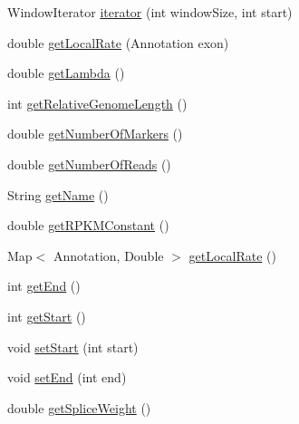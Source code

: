 \begin{DoxyCompactItemize}
Window\+Iterator \hyperlink{classbroad_1_1pda_1_1seq_1_1graph_1_1_chromosome_with_bubbles_j_graph_t_ad93630c30d07df9cb9a639e656a0851c}{iterator} (int window\+Size, int start)
\item 
double \hyperlink{classbroad_1_1pda_1_1seq_1_1graph_1_1_chromosome_with_bubbles_j_graph_t_adda80fdb6e6d20255389643e6cb4d3a2}{get\+Local\+Rate} (Annotation exon)
\item 
double \hyperlink{classbroad_1_1pda_1_1seq_1_1graph_1_1_chromosome_with_bubbles_j_graph_t_a7d20d81fde6834294a8876c1e1a1c12d}{get\+Lambda} ()
\item 
int \hyperlink{classbroad_1_1pda_1_1seq_1_1graph_1_1_chromosome_with_bubbles_j_graph_t_a069b16c959ceace301b673830ab49e1e}{get\+Relative\+Genome\+Length} ()
\item 
double \hyperlink{classbroad_1_1pda_1_1seq_1_1graph_1_1_chromosome_with_bubbles_j_graph_t_a4c0a0f55287f464249e043a627acc561}{get\+Number\+Of\+Markers} ()
\item 
double \hyperlink{classbroad_1_1pda_1_1seq_1_1graph_1_1_chromosome_with_bubbles_j_graph_t_a37fc1481c4cc33dd1f711370017c5231}{get\+Number\+Of\+Reads} ()
\item 
String \hyperlink{classbroad_1_1pda_1_1seq_1_1graph_1_1_chromosome_with_bubbles_j_graph_t_a684dcbe674fa90359576b194050d3681}{get\+Name} ()
\item 
double \hyperlink{classbroad_1_1pda_1_1seq_1_1graph_1_1_chromosome_with_bubbles_j_graph_t_a2cfac25b852dd32fc35288340e02e4b3}{get\+R\+P\+K\+M\+Constant} ()
\item 
Map$<$ Annotation, Double $>$ \hyperlink{classbroad_1_1pda_1_1seq_1_1graph_1_1_chromosome_with_bubbles_j_graph_t_ac33505d2b9bf26961b4406c6e3b793d3}{get\+Local\+Rate} ()
\item 
int \hyperlink{classbroad_1_1pda_1_1seq_1_1graph_1_1_chromosome_with_bubbles_j_graph_t_a0837c3a39bc327a0e2e249a92c98a1aa}{get\+End} ()
\item 
int \hyperlink{classbroad_1_1pda_1_1seq_1_1graph_1_1_chromosome_with_bubbles_j_graph_t_a64465fbdfb57e6549113e47877c9b37a}{get\+Start} ()
\item 
void \hyperlink{classbroad_1_1pda_1_1seq_1_1graph_1_1_chromosome_with_bubbles_j_graph_t_ad475cd8839a0836c9939bb17a1235d5b}{set\+Start} (int start)
\item 
void \hyperlink{classbroad_1_1pda_1_1seq_1_1graph_1_1_chromosome_with_bubbles_j_graph_t_afebca982cb0e0752e8ec6749f1238bc3}{set\+End} (int end)
\item 
double \hyperlink{classbroad_1_1pda_1_1seq_1_1graph_1_1_chromosome_with_bubbles_j_graph_t_a3e8f397fe2620928de69b3165ecc1fde}{get\+Splice\+Weight} ()

\end{DoxyCompactItemize}

